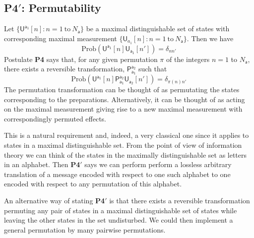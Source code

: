 \documentclass[10pt]{article}
\begin{document}


\subsection{{\bf P4}$'$: Permutability}

 Let $\{ \mathsf{U^{a_1}}[n]: n=1~ \text{to} ~ N_\mathsf{a} \}$ be a maximal distinguishable set of states with corresponding maximal measurement $\{\mathsf U_{a_1}[n]: n=1 ~\text{to} ~N_\mathsf{a}\}$.  Then we have
\begin{equation}
\text{Prob}(\mathsf{U}^\mathsf{a_1}[n]\mathsf U_\mathsf{a_1}[n'] )=\delta_{nn'}
\end{equation}
Postulate {\bf P4} says that, for any given permutation $\pi$ of the integers $n=1$ to $N_\mathsf{a}$, there exists a reversible transformation, $\mathsf{P_{a_1}^{a_2}}$ such that
\begin{equation}
\text{Prob}(\mathsf{U}^\mathsf{a_1}[n]\mathsf{P_{a_1}^{a_2}}\mathsf U_\mathsf{a_2}[n'] )=\delta_{\pi(n)n'}
\end{equation}
The permutation transformation can be thought of as permutating the states corresponding to the preparations.  Alternatively, it can be thought of as acting on the maximal measurement giving rise to a new maximal measurement with correspondingly permuted effects.

This is a natural requirement and, indeed, a very classical one since it applies to states in a maximal distinguishable set.  From the point of view of information theory we can think of the states in the maximally distinguishable set as letters in an alphabet. Then {\bf P4}$'$ says we can perform perform a lossless arbitrary translation of a message encoded with respect to one such alphabet to one encoded with respect to any permutation of this alphabet.

An alternative way of stating {\bf P4}$'$ is that there exists a reversible transformation permuting any pair of states in a maximal distinguishable set of states while leaving the other states in the set undisturbed.  We could then implement a general permutation by many pairwise permutations.
\end{document}
